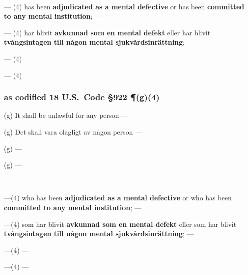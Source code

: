 \documentclass[a4,landscape,12pt]{article}
\begin{document}
~

\begin{minipage}[t]{0.22\textwidth}
--- (4) has been \textbf{adjudicated as a mental defective} or has been \textbf{committed to any mental institution}; ---
\end{minipage}\textwidth
\begin{minipage}[t]{0.22\textwidth}
--- (4) har blivit \textbf{avkunnad som en mental defekt} eller har blivit \textbf{tvångsintagen till någon mental sjukvårdsinrättning}; ---
\end{minipage}\textwidth
\begin{minipage}[t]{0.22\textwidth}
--- (4)
\end{minipage}\textwidth
\begin{minipage}[t]{0.22\textwidth}
--- (4)
\end{minipage}

\subsubsection*{as codified 18 U.S.~Code \S 922 \P(g)(4)}


\begin{minipage}[t]{0.22\textwidth}
(g) It shall be unlawful for any person ---
\end{minipage}\textwidth
\begin{minipage}[t]{0.22\textwidth}
(g) Det skall vara olagligt av någon person ---
\end{minipage}\textwidth
\begin{minipage}[t]{0.22\textwidth}
(g) ---
\end{minipage}\textwidth
\begin{minipage}[t]{0.22\textwidth}
(g) ---
\end{minipage}

~

\begin{minipage}[t]{0.22\textwidth}
---(4) who has been \textbf{adjudicated as a mental defective} or who has been \textbf{committed to any mental institution}; ---
\end{minipage}\textwidth
\begin{minipage}[t]{0.22\textwidth}
---(4) som har blivit \textbf{avkunnad som en mental defekt} eller som har blivit \textbf{tvångsintagen till någon mental sjukvårdsinrättning}; ---
\end{minipage}\textwidth
\begin{minipage}[t]{0.22\textwidth}
---(4) ---
\end{minipage}\textwidth
\begin{minipage}[t]{0.22\textwidth}
---(4) ---
\end{minipage}
\end{document}
